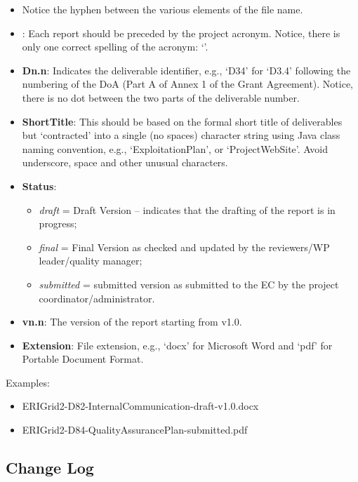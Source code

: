 \begin{itemize}
	\item Notice the hyphen between the various elements of the file name.
    \item {\bf \numpex{}}: Each \numpex{} report should be preceded by the project acronym. Notice, there is only one correct spelling of the acronym: ‘\numpex{}’. 
    \item {\bf Dn.n}: Indicates the deliverable identifier, e.g., ‘D34’ for ‘D3.4’ following the numbering of the \ac{DoA} (Part A of Annex 1 of the Grant Agreement). Notice, there is no dot between the two parts of the deliverable number.
    \item {\bf ShortTitle}: This should be based on the formal short title of deliverables but ‘contracted’ into a single (no spaces) character string using Java class naming convention, e.g., ‘ExploitationPlan’,  or ‘ProjectWebSite’. Avoid underscore, space and other unusual characters.
	\item {\bf Status}: 
	\begin{itemize}
		\item \textit{draft} = Draft Version – indicates that the drafting of the report is in progress; 
		\item \textit{final} = Final Version as checked and updated by the reviewers/WP leader/quality manager; 
		\item \textit{submitted} = submitted version as submitted to the EC by the project coordinator/administrator.
	\end{itemize}
	\item {\bf vn.n}: The version of the report starting from v1.0. 
    \item {\bf Extension}: File extension, e.g., ‘docx’ for Microsoft Word and ‘pdf’ for Portable Document Format. 
\end{itemize}

Examples:

\begin{itemize}
    \item ERIGrid2-D82-InternalCommunication-draft-v1.0.docx
    \item ERIGrid2-D84-QualityAssurancePlan-submitted.pdf
\end{itemize}

\subsection{Change Log}
\label{sec:change-log}

